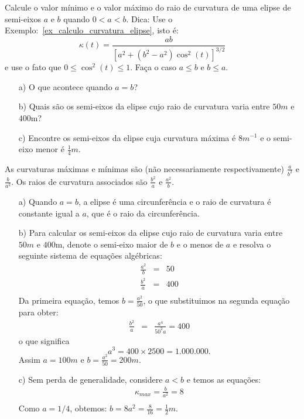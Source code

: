 \begin{exeresol}
Calcule o valor mínimo e o valor máximo do raio de curvatura de uma elipse de semi-eixos $a$ e $b$ quando $0<a<b$. 
Dica: Use o Exemplo:~\ref{ex_calculo_curvatura_elipse}, isto é:
$$\kappa(t)=\frac{ab}{\left[a^2+(b^2-a^2)\cos^2(t)\right]^{3/2}}$$
e use o fato que $0\leq \cos^2(t) \leq1$. Faça o caso $a\leq b$ e $b \leq a$.

\begin{itemize}
 \item[a)] O que acontece quando $a=b$?
 \item[b)] Quais são os semi-eixos da elipse cujo raio de curvatura varia entre $50m$ e $400$m?
 \item[c)] Encontre os semi-eixos da elipse cuja curvatura máxima é $8m^{-1}$ e o semi-eixo menor é $\frac{1}{4}m$.
\end{itemize}
\end{exeresol}
\begin{resol}
As curvaturas máximas e mínimas são (não necessariamente respectivamente) $\frac{a}{b^2}$ e $\frac{b}{a^2}$. Os raios de curvatura associados são $\frac{b^2}{a}$ e $\frac{a^2}{b}$.
\begin{itemize}
 \item[a)] Quando $a=b$, a elipse é uma circunferência e o raio de curvatura é constante igual a $a$, que é o raio da circunferência.
\item[b)] Para calcular os semi-eixos da elipse cujo raio de curvatura varia entre $50m$ e $400$m, denote o semi-eixo maior de $b$ e o menos de $a$ e resolva o seguinte sistema de equações algébricas:
 \begin{eqnarray*}
  \frac{a^2}{b} &=& 50\\
  \frac{b^2}{a} &=& 400\\
 \end{eqnarray*}
 Da primeira equação, temos $b=\frac{a^2}{50}$, o que substituimos na segunda equação para obter:
 \begin{eqnarray*}
   \frac{b^2}{a} &=& \frac{a^4}{50^2a}=400
 \end{eqnarray*}
o que significa
$$a^3=400\times 2500 = 1.000.000.$$
 Assim $a=100m$ e $b=\frac{a^2}{50}=200m$.
\item[c)] Sem perda de generalidade, considere $a<b$ e temos as equações:
  \begin{eqnarray*}\kappa_{max}=\frac{b}{a^2}=8\\
  \end{eqnarray*}
     Como $a=1/4$, obtemos:
     $b=8a^2=\frac{8}{16}=\frac{1}{2}m$.
 \end{itemize}


\end{resol}

